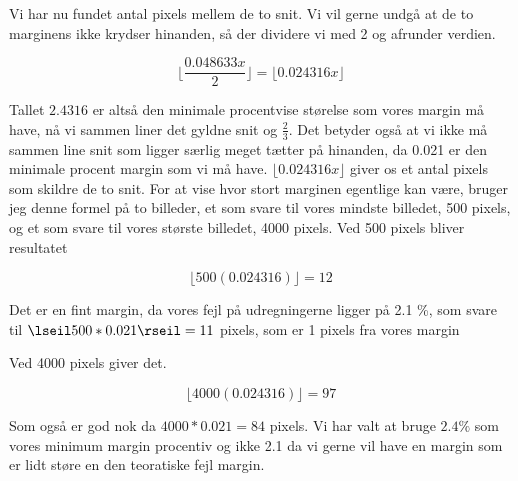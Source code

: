 Vi har nu fundet antal pixels mellem de to snit. Vi vil gerne undgå at
de to marginens ikke krydser hinanden, så der dividere vi med 2 og
afrunder verdien.

\begin{equation}
	\lfloor \frac{0.048633x}{2}\rfloor = \lfloor0.024316x \rfloor
\end{equation}

Tallet $2.4316$ er altså den minimale procentvise størelse som vores
margin må have, nå vi sammen liner det gyldne snit og $\frac{2}{3}$.
Det betyder også at vi ikke må sammen line snit som ligger særlig
meget tætter på hinanden, da 0.021 er den minimale procent margin som vi må have.
$\lfloor 0.024316x \rfloor$ giver os et antal pixels som skildre de to snit. For at vise
hvor stort marginen egentlige kan være, bruger jeg denne formel på to
billeder, et som svare til vores mindste billedet, 500 pixels, og et
som svare til vores største billedet, 4000 pixels. Ved 500 pixels
bliver resultatet

\begin{equation}
	 \lfloor 500(0.024316)\rfloor = 12
\end{equation}

Det er en fint margin, da vores fejl på udregningerne ligger på 2.1 \%,
som svare til $\lseil 500*0.021 \rseil = 11$ pixels, som er 1 pixels fra vores
margin

Ved 4000 pixels giver det.

\begin{equation}
	 \lfloor 4000(0.024316)\rfloor = 97
\end{equation}

Som også er god nok da $4000*0.021 = 84$ pixels. Vi har valt at bruge
$2.4\%$ som vores minimum margin procentiv og ikke 2.1 da vi gerne
vil have en margin som er lidt støre en den teoratiske fejl margin.
\label{margin}
